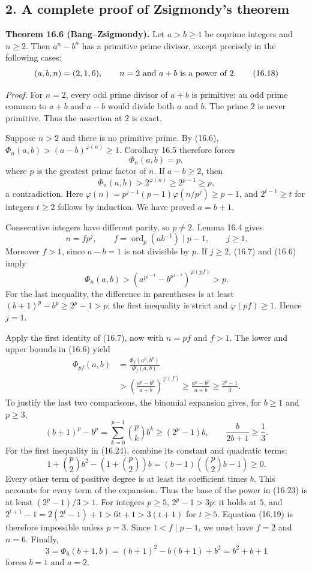 \documentclass[
  11pt,
  a4paper,
]{article}
\begin{document}
\subsection{2. A complete proof of Zsigmondy's
theorem}\label{a-complete-proof-of-zsigmondys-theorem}

\textbf{Theorem 16.6 (Bang--Zsigmondy).} Let \(a>b\geq1\) be coprime
integers and \(n\geq2\). Then \(a^n-b^n\) has a primitive prime divisor,
except precisely in the following cases: \[
 (a,b,n)=(2,1,6),\qquad
 n=2\ \hbox{and}\ a+b\ \hbox{is a power of }2.
 \tag{16.18}
\]

\emph{Proof.} For \(n=2\), every odd prime divisor of \(a+b\) is
primitive: an odd prime common to \(a+b\) and \(a-b\) would divide both
\(a\) and \(b\). The prime \(2\) is never primitive. Thus the assertion
at \(2\) is exact.

Suppose \(n>2\) and there is no primitive prime. By (16.6),
\(\Phi_n(a,b)>(a-b)^{\varphi(n)}\geq1\). Corollary 16.5 therefore forces
\[
 \Phi_n(a,b)=p,
 \tag{16.19}
\] where \(p\) is the greatest prime factor of \(n\). If \(a-b\geq2\),
then \[
 \Phi_n(a,b)>2^{\varphi(n)}
          \geq2^{p-1}\geq p,
 \tag{16.20}
\] a contradiction. Here
\(\varphi(n)=p^{j-1}(p-1)\varphi(n/p^j)\geq p-1\), and \(2^{t-1}\geq t\)
for integers \(t\geq2\) follows by induction. We have proved \(a=b+1\).

Consecutive integers have different parity, so \(p\ne2\). Lemma 16.4
gives \[
 n=fp^j,\qquad f=\operatorname{ord}_p(ab^{-1})\mid p-1,
 \qquad j\geq1.
 \tag{16.21}
\] Moreover \(f>1\), since \(a-b=1\) is not divisible by \(p\). If
\(j\geq2\), (16.7) and (16.6) imply \[
 \Phi_n(a,b)>
 \left(a^{p^{j-1}}-b^{p^{j-1}}\right)^{\varphi(pf)}
 {}>p.
 \tag{16.22}
\] For the last inequality, the difference in parentheses is at least
\((b+1)^p-b^p\geq2^p-1>p\); the first inequality is strict and
\(\varphi(pf)\geq1\). Hence \(j=1\).

Apply the first identity of (16.7), now with \(n=pf\) and \(f>1\). The
lower and upper bounds in (16.6) yield \[
 \begin{aligned}
 \Phi_{pf}(a,b)
 &=\frac{\Phi_f(a^p,b^p)}{\Phi_f(a,b)}\\
 &>\left(\frac{a^p-b^p}{a+b}\right)^{\varphi(f)}
 \geq\frac{a^p-b^p}{a+b}
 \geq\frac{2^p-1}{3}.
 \end{aligned}
 \tag{16.23}
\] To justify the last two comparisons, the binomial expansion gives,
for \(b\geq1\) and \(p\geq3\), \[
 (b+1)^p-b^p
 =\sum_{k=0}^{p-1}\binom pk b^k
 \geq(2^p-1)b,
 \qquad \frac b{2b+1}\geq\frac13.
 \tag{16.24}
\] For the first inequality in (16.24), combine its constant and
quadratic terms: \[
 1+\binom p2 b^2-\left(1+\binom p2\right)b
 =(b-1)\left(\binom p2 b-1\right)\geq0.
\] Every other term of positive degree is at least its coefficient times
\(b\). This accounts for every term of the expansion. Thus the base of
the power in (16.23) is at least \((2^p-1)/3>1\). For integers
\(p\geq5\), \(2^p-1>3p\): it holds at \(5\), and
\(2^{t+1}-1=2(2^t-1)+1>6t+1>3(t+1)\) for \(t\geq5\). Equation (16.19) is
therefore impossible unless \(p=3\). Since \(1<f\mid p-1\), we must have
\(f=2\) and \(n=6\). Finally, \[
 3=\Phi_6(b+1,b)=(b+1)^2-b(b+1)+b^2=b^2+b+1
 \tag{16.25}
\] forces \(b=1\) and \(a=2\).
\end{document}
